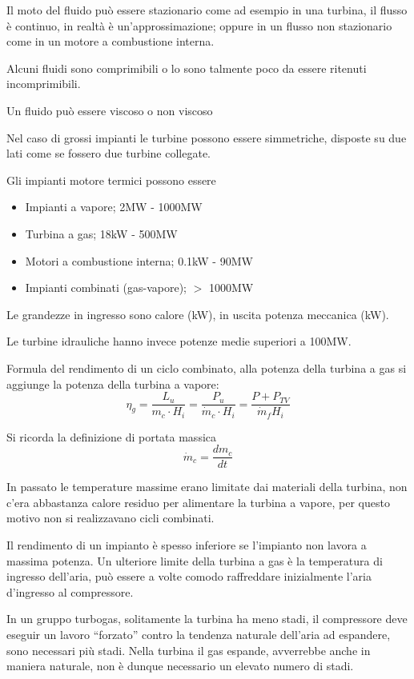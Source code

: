 Il moto del fluido può essere stazionario come ad esempio in una turbina, il
flusso è continuo, in realtà è un'approssimazione; oppure in un flusso non
stazionario come in un motore a combustione interna.

Alcuni fluidi sono comprimibili o lo sono talmente poco da essere ritenuti
incomprimibili.

Un fluido può essere viscoso o non viscoso

Nel caso di grossi impianti le turbine possono essere simmetriche, disposte su
due lati come se fossero due turbine collegate.

Gli impianti motore termici possono essere
\begin{itemize}
 \item Impianti a vapore; 2MW - 1000MW
 \item Turbina a gas; 18kW - 500MW
 \item Motori a combustione interna; 0.1kW - 90MW
 \item Impianti combinati (gas-vapore); $>$ 1000MW
\end{itemize}

Le grandezze in ingresso sono calore (kW), in uscita potenza meccanica (kW).

Le turbine idrauliche hanno invece potenze medie superiori a 100MW.


Formula del rendimento di un ciclo combinato, alla potenza della turbina a gas
si aggiunge la potenza della turbina a vapore:
\begin{equation}
\eta_g = \frac{L_u}{m_c\cdot H_i} =\frac{P_u}{\dot{m}_c \cdot H_i} =
\frac{P+P_{TV}}{\dot{m}_f H_i}
\end{equation}

Si ricorda la definizione di portata massica
\begin{equation}
\dot{m}_c = \frac{dm_c}{dt}
\end{equation}

In passato le temperature massime erano limitate dai materiali della turbina,
non c'era abbastanza calore residuo per alimentare la turbina a vapore, per
questo motivo non si realizzavano cicli combinati.

Il rendimento di un impianto è spesso inferiore se l'impianto non lavora a
massima potenza.
Un ulteriore limite della turbina a gas è la temperatura di ingresso dell'aria,
può essere a volte comodo raffreddare inizialmente l'aria d'ingresso al
compressore.

In un gruppo turbogas, solitamente la turbina ha meno stadi, il compressore
deve eseguir un lavoro ``forzato'' contro la tendenza naturale dell'aria ad
espandere, sono necessari più stadi.
Nella turbina il gas espande, avverrebbe anche in maniera naturale, non è
dunque necessario un elevato numero di stadi.

